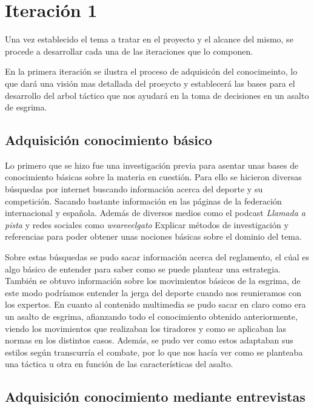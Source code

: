 \section{Iteración 1}

Una vez establecido el tema a tratar en el proyecto y el alcance del mismo,
se procede a desarrollar cada una de las iteraciones que lo componen.

En la primera iteración se ilustra el proceso de adquisicón del conocimeinto,
lo que dará una visión mas detallada del proeycto y establecerá las bases
para el desarrollo del arbol táctico que nos ayudará en la toma de decisiones en un asalto de esgrima.

\subsection{Adquisición conocimiento básico}

Lo primero que se hizo fue una investigación previa para asentar unas bases de conocimiento
básicas sobre la materia en cuestión. Para ello se hicieron diversas búsquedas por internet
buscando información acerca del deporte y su competición. Sacando bastante información
en las páginas de la federación internacional y española. Además de diversos medios como
el podcast \textit{Llamada a pista} y redes sociales como \textit{weareeelgato}
Explicar métodos de investigación y referencias para poder obtener unas nociones básicas
sobre el dominio del tema.

Sobre estas búsquedas se pudo sacar información acerca del reglamento, el cúal es algo
básico de entender para saber como se puede plantear una estrategia. También se obtuvo
información sobre los movimientos básicos de la esgrima, de este modo podríamos entender
la jerga del deporte cuando nos reunieramos con los expertos. En cuanto al contenido
multimedia se pudo sacar en claro como era un asalto de esgrima, afianzando todo el conocimiento
obtenido anteriormente, viendo los movimientos que realizaban los tiradores y como
se aplicaban las normas en los distintos casos. Además, se pudo ver como estos adaptaban
sus estilos según transcurría el combate, por lo que nos hacía ver como se planteaba
una táctica u otra en función de las características del asalto.

\subsection{Adquisición conocimiento mediante entrevistas}

